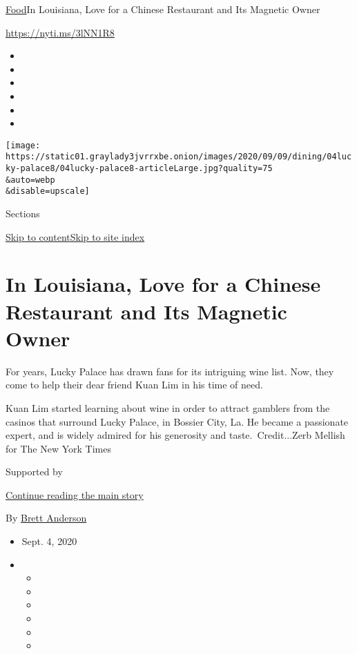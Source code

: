 \href{/section/food}{Food}\textbar{}In Louisiana, Love for a Chinese
Restaurant and Its Magnetic Owner

\url{https://nyti.ms/3lNN1R8}

\begin{itemize}
\item
\item
\item
\item
\item
\item
\end{itemize}

\texttt{[image: https://static01.graylady3jvrrxbe.onion/images/2020/09/09/dining/04lucky-palace8/04lucky-palace8-articleLarge.jpg?quality=75\\\&auto=webp\\\&disable=upscale]}

Sections

\protect\hyperlink{site-content}{Skip to
content}\protect\hyperlink{site-index}{Skip to site index}

\hypertarget{in-louisiana-love-for-a-chinese-restaurant-and-its-magnetic-owner}{%
\section{In Louisiana, Love for a Chinese Restaurant and Its Magnetic
Owner}\label{in-louisiana-love-for-a-chinese-restaurant-and-its-magnetic-owner}}

For years, Lucky Palace has drawn fans for its intriguing wine list.
Now, they come to help their dear friend Kuan Lim in his time of need.

Kuan Lim started learning about wine in order to attract gamblers from
the casinos that surround Lucky Palace, in Bossier City, La. He became a
passionate expert, and is widely admired for his generosity and
taste.~Credit...Zerb Mellish for The New York Times

Supported by

\protect\hyperlink{after-sponsor}{Continue reading the main story}

By \href{https://www.nytimes3xbfgragh.onion/by/brett-anderson}{Brett
Anderson}

\begin{itemize}
\item
  Sept. 4, 2020
\item
  \begin{itemize}
  \item
  \item
  \item
  \item
  \item
  \item
  \end{itemize}
\end{itemize}

